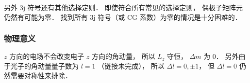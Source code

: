 另外 3j 符号还有其他选择定则． 即使符合所有常见的选择定则， 偶极子矩阵元仍然有可能为零． 找到所有 3j 符号（或 CG 系数）为零的情况是十分困难的．

\subsubsection{物理意义}
$z$ 方向的电场不会改变电子 $z$ 方向的角动量， 所以 $L_z$ 守恒， $\Delta m$ 为 0． 另外由于光子的角动量量子数为 $l=1$ （链接未完成）， 所以 $\Delta l = 0, \pm 1$， 但 $\Delta l = 0$ 仍然需要对称性来排除．
